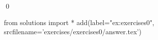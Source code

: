 
\begin{ex} 
  \label{ex:exercises0}
  
  \qed
\end{ex} 
\begin{python0}
from solutions import *
add(label="ex:exercises0",
    srcfilename='exercises/exercises0/answer.tex') 
\end{python0}
